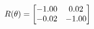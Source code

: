 \documentclass[preview]{standalone}
\begin{document}
\begin{align*}
\special{dvisvgm:raw <g id='unique000'>}R(\theta) = \begin{bmatrix}-1.00 & 0.02\\-0.02 & -1.00\end{bmatrix}\special{dvisvgm:raw </g>}
\end{align*}
\end{document}
